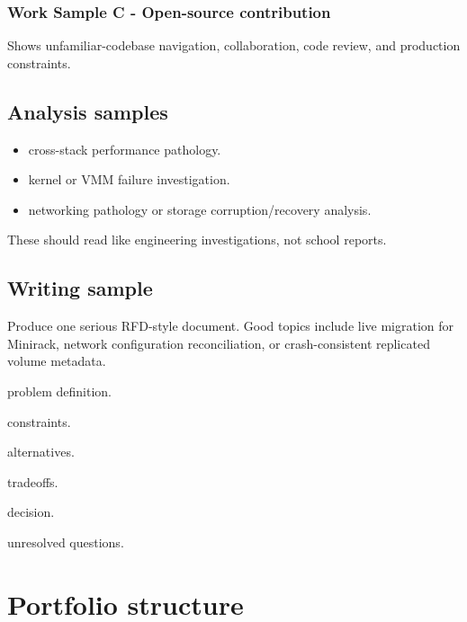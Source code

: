 \documentclass[11pt,letterpaper]{article}
\begin{document}
\subsubsection*{Work Sample C - Open-source contribution}

Shows unfamiliar-codebase navigation, collaboration, code review, and production constraints.

\subsection*{Analysis samples}

\begin{itemize}

\item cross-stack performance pathology.

\item kernel or VMM failure investigation.

\item networking pathology or storage corruption/recovery analysis.

\end{itemize}

These should read like engineering investigations, not school reports.

\subsection*{Writing sample}

Produce one serious RFD-style document. Good topics include live migration for Minirack, network configuration reconciliation, or crash-consistent replicated volume metadata.

\begin{topics}

\item problem definition.

\item constraints.

\item alternatives.

\item tradeoffs.

\item decision.

\item unresolved questions.

\end{topics}

\section{Portfolio structure}\label{sec:17}
\end{document}
